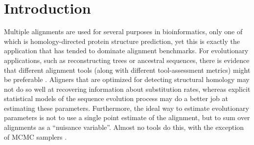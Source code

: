 
\section{Introduction}

Multiple alignments are used for several purposes in bioinformatics,
only one of which is homology-directed protein structure prediction,
yet this is exactly the application that has tended to dominate alignment benchmarks.
For evolutionary applications, such as reconstructing trees or ancestral sequences,
there is evidence that
different alignment tools (along with different tool-assessment metrics) might be preferable \citep{LoytynojaGoldman2008,Westesson2012-zg}.
Aligners that are optimized for detecting structural homology may not do so well at recovering information about substitution rates,
whereas explicit statistical models of the sequence evolution process may do a better job at estimating these parameters.
Furthermore, the ideal way to estimate evolutionary parameters is not to use a single point estimate of the alignment, but to sum over alignments as a ``nuisance variable''.
Almost no tools do this, with the exception of MCMC samplers \citep{WestessonBarquistHolmes2012,Redelings2014}.

